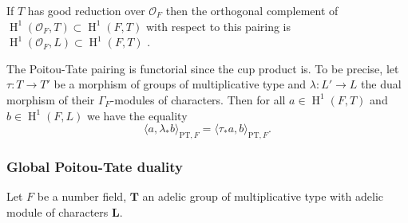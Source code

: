 \documentclass[a4paper,11pt,reqno]{amsart}
\DeclareMathOperator{\HH}{H}
\theoremstyle{definition}
\begin{document}
If $T$ has good reduction over $\mathcal{O}_F$ then the orthogonal complement of $\HH^1(\mathcal{O}_F, T) \subset \HH^1(F, T)$ with respect to this pairing is $\HH^1(\mathcal{O}_F, L) \subset \HH^1(F, T)$ \cite[Thm. 2.6]{Milne2006Duality}.

The Poitou-Tate pairing is functorial since the cup product is. To be precise, let $\tau: T \to T'$ be a morphism of groups of multiplicative type and $\lambda: L' \to L$ the dual morphism of their $\Gamma_F$-modules of characters. Then for all $a \in \HH^1(F, T)$ and $b \in \HH^1(F, L)$ we have the equality
\begin{equation}
	\langle a, \lambda_* b \rangle_{\text{PT}, F} = \langle \tau_* a, b \rangle_{\text{PT}, F}.
	\label{Functoriality of local Poitou-Tate pairing}
\end{equation}

\subsubsection{Global Poitou-Tate duality}
Let $F$ be a number field, $\mathbf{T}$ an adelic group of multiplicative type with adelic module of characters $\mathbf{L}$.
\end{document}
